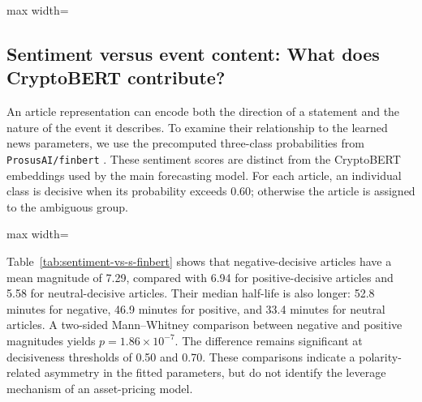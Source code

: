 \begin{table}[htbp]
\centering\small
\caption{News category and learned impact heterogeneity (BTC, 4-hour)}
\label{tab:news-taxonomy}
\begin{adjustbox}{max width=\textwidth}

\end{adjustbox}
\end{table}



\subsection{Sentiment versus event content: What does CryptoBERT contribute?}
\label{sec:sentiment}

An article representation can encode both the direction of a statement
and the nature of the event it describes. To examine their relationship
to the learned news parameters, we use the precomputed three-class
probabilities from \texttt{ProsusAI/finbert} \citep{Araci2019}.
These sentiment scores are distinct from the CryptoBERT embeddings
used by the main forecasting model. For each article, an individual
class is decisive when its probability exceeds 0.60; otherwise the
article is assigned to the ambiguous group.

\begin{table}[htbp]
\centering\small
\caption{FinBERT sentiment and learned article magnitude (BTC, 4-hour)}
\label{tab:sentiment-vs-s-finbert}
\begin{adjustbox}{max width=\textwidth}

\end{adjustbox}
\end{table}

Table~\ref{tab:sentiment-vs-s-finbert} shows that negative-decisive
articles have a mean magnitude of 7.29, compared with 6.94 for
positive-decisive articles and 5.58 for neutral-decisive articles.
Their median half-life is also longer: 52.8 minutes for negative,
46.9 minutes for positive, and 33.4 minutes for neutral articles.
A two-sided Mann--Whitney comparison between negative and positive
magnitudes yields $p=1.86\times10^{-7}$. The difference remains
significant at decisiveness thresholds of 0.50 and 0.70. These
comparisons indicate a polarity-related asymmetry in the fitted
parameters, but do not identify the leverage mechanism of an
asset-pricing model.


